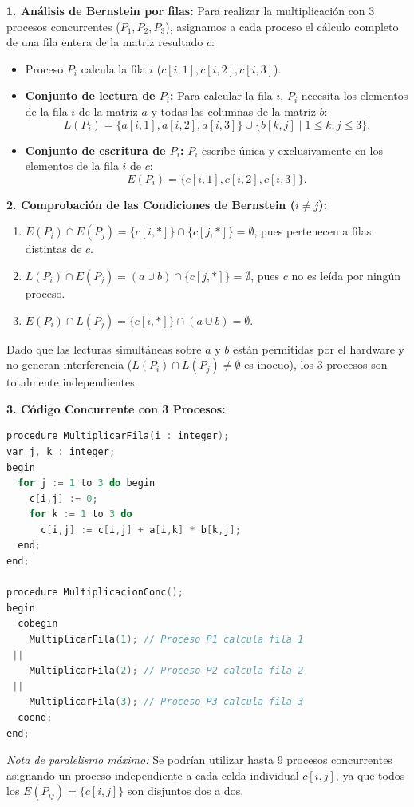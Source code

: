 \begin{solucion}
\textbf{1. Análisis de Bernstein por filas:}
Para realizar la multiplicación con 3 procesos concurrentes ($P_1, P_2, P_3$), asignamos a cada proceso el cálculo completo de una fila entera de la matriz resultado $c$:
\begin{itemize}
    \item Proceso $P_i$ calcula la fila $i$ ($c[i, 1], c[i, 2], c[i, 3]$).
    \item \textbf{Conjunto de lectura de $P_i$:} Para calcular la fila $i$, $P_i$ necesita los elementos de la fila $i$ de la matriz $a$ y todas las columnas de la matriz $b$:
    \[
    L(P_i) = \{a[i, 1], a[i, 2], a[i, 3]\} \cup \{b[k, j] \mid 1 \le k, j \le 3\}.
    \]
    \item \textbf{Conjunto de escritura de $P_i$:} $P_i$ escribe única y exclusivamente en los elementos de la fila $i$ de $c$:
    \[
    E(P_i) = \{c[i, 1], c[i, 2], c[i, 3]\}.
    \]
\end{itemize}

\textbf{2. Comprobación de las Condiciones de Bernstein ($i \neq j$):}
\begin{enumerate}
    \item $E(P_i) \cap E(P_j) = \{c[i, *]\} \cap \{c[j, *]\} = \emptyset$, pues pertenecen a filas distintas de $c$.
    \item $L(P_i) \cap E(P_j) = (a \cup b) \cap \{c[j, *]\} = \emptyset$, pues $c$ no es leída por ningún proceso.
    \item $E(P_i) \cap L(P_j) = \{c[i, *]\} \cap (a \cup b) = \emptyset$.
\end{enumerate}
Dado que las lecturas simultáneas sobre $a$ y $b$ están permitidas por el hardware y no generan interferencia ($L(P_i) \cap L(P_j) \neq \emptyset$ es inocuo), los 3 procesos son totalmente independientes.

\textbf{3. Código Concurrente con 3 Procesos:}
\begin{lstlisting}[language=C++]
procedure MultiplicarFila(i : integer);
var j, k : integer;
begin
  for j := 1 to 3 do begin
    c[i,j] := 0;
    for k := 1 to 3 do
      c[i,j] := c[i,j] + a[i,k] * b[k,j];
  end;
end;

procedure MultiplicacionConc();
begin
  cobegin
    MultiplicarFila(1); // Proceso P1 calcula fila 1
 ||
    MultiplicarFila(2); // Proceso P2 calcula fila 2
 ||
    MultiplicarFila(3); // Proceso P3 calcula fila 3
  coend;
end;
\end{lstlisting}
\textit{Nota de paralelismo máximo:} Se podrían utilizar hasta 9 procesos concurrentes asignando un proceso independiente a cada celda individual $c[i,j]$, ya que todos los $E(P_{ij}) = \{c[i,j]\}$ son disjuntos dos a dos.
\end{solucion}

